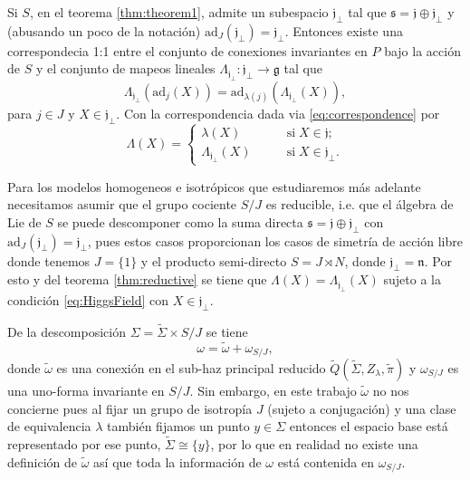 \begin{thm}
\label{thm:reductive}
Si $S$, en el teorema \ref{thm:theorem1}, admite un subespacio $\mathfrak{j}_{\perp}$ tal que $\mathfrak{s} = \mathfrak{j} \oplus \mathfrak{j}_{\perp}$ y (abusando un poco de la notaci\'{o}n) $\mathrm{ad}_{J} (\mathfrak{j}_{\perp}) = \mathfrak{j}_{\perp}$. Entonces existe una correspondecia 1:1 entre el conjunto de conexiones invariantes en $P$ bajo la acci\'{o}n de $S$ y el conjunto de mapeos lineales $\Lambda_{\mathfrak{j}_{\perp}}: \mathfrak{j}_{\perp} \longrightarrow \mathfrak{g}$ tal que
%
\begin{equation}
\label{eq:HiggsField}
\Lambda_{\mathfrak{j}_{\perp}} (\mathrm{ad}_{j} (X)) = \mathrm{ad}_{\lambda (j)} (\Lambda_{\mathfrak{j}_{\perp}} (X)),
\end{equation}
%
para $j \in J$ y $X \in \mathfrak{j}_{\perp}$. Con la correspondencia dada via \eqref{eq:correspondence} por
%
$$
\Lambda (X) = 
\begin{cases}
\lambda (X) \qquad & \mathrm{si} \; X\in \mathfrak{j}; \\
\Lambda_{\mathfrak{j}_{\perp}} (X) \qquad & \mathrm{si} \; X \in \mathfrak{j}_{\perp}.
\end{cases}
$$
%
\end{thm}

Para los modelos homogeneos e isotr\'{o}picos que estudiaremos m\'{a}s adelante necesitamos asumir que el grupo cociente $S/J$ es reducible, i.e. que el \'{a}lgebra de Lie de $S$ se puede descomponer como la suma directa $\mathfrak{s} = \mathfrak{j} \oplus \mathfrak{j}_{\perp}$ con $\mathrm{ad}_{J}(\mathfrak{j_{\perp}}) = \mathfrak{j_{\perp}}$, pues estos casos proporcionan los casos de simetr\'{i}a de acci\'{o}n libre donde tenemos $J =\{1\}$ y el producto semi-directo $S = J \rtimes N$, donde $\mathfrak{j_{\perp}} = \mathfrak{n}$. Por esto y del teorema \ref{thm:reductive} se tiene que $\Lambda (X) = \Lambda_{\mathfrak{j}_{\perp}} (X)$ sujeto a la condici\'{o}n \eqref{eq:HiggsField} con $X \in \mathfrak{j}_{\perp}$.

De la descomposici\'{o}n $\Sigma = \tilde{\Sigma} \times S/J$ se tiene
%
\begin{equation}
\omega = \tilde{\omega} + \omega_{S/J},
\end{equation}
%
donde $\tilde{\omega}$ es una conexi\'{o}n en el sub-haz principal reducido $\tilde{Q}(\tilde{\Sigma}, Z_{\lambda}, \tilde{\pi})$ y $\omega_{S/J}$ es una uno-forma invariante en $S/J$. Sin embargo, en este trabajo $\tilde{\omega}$ no nos concierne pues al fijar un grupo de isotrop\'{i}a $J$ (sujeto a conjugaci\'{o}n) y una clase de equivalencia $\lambda$ tambi\'{e}n fijamos un punto $y \in \Sigma$ entonces el espacio base est\'{a} representado por ese punto, $\tilde{\Sigma} \cong \{y\}$, por lo que en realidad no existe una definici\'{o}n de $\tilde{\omega}$ as\'{i} que toda la informaci\'{o}n de $\omega$ est\'{a} contenida en $\omega_{S/J}$.

